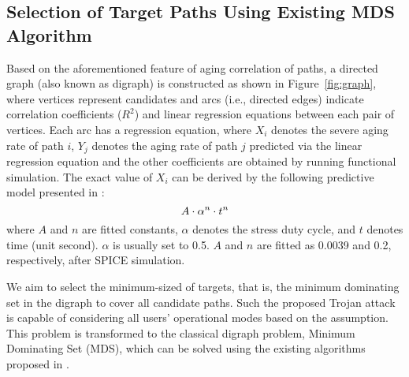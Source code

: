 \subsection{Selection of Target Paths Using Existing MDS Algorithm}
\label{sec:frame:mds}
Based on the aforementioned feature of aging correlation of paths, a directed graph (also known as digraph) is constructed as shown in Figure~\ref{fig:graph}, where vertices represent candidates and arcs (i.e., directed edges) indicate correlation coefficients ($R^2$) and linear regression equations between each pair of vertices. Each arc has a regression equation, where $X_{i}$ denotes the severe aging rate of path $i$, $Y_{j}$ denotes the aging rate of path $j$ predicted via the linear regression equation and the other coefficients are obtained by running functional simulation. The exact value of $X_{i}$ can be derived by the following predictive model presented in \cite{wang2007efficient}:
\begin{equation}
	\fontsize{8}{8} \selectfont
	A \cdot \alpha^n \cdot t^n 
	\label{eq:worst}
\end{equation}
where $A$ and $n$ are fitted constants, $\alpha$ denotes the stress duty cycle, and $t$ denotes time (unit second). $\alpha$ is usually set to 0.5. $A$ and $n$ are fitted as 0.0039 and 0.2, respectively, after SPICE simulation.

\begin{comment}
Consider the red equation in Figure~\ref{fig:graph}:
\begin{equation}
	\centering
	\fontsize{8}{8} \selectfont
	Y_{1} = 0.98 \cdot X_{2} - 0.02
\end{equation}
where $X_{2}$ is the aging rate of vertex/path 2 and $Y_{1}$ is the aging rate of vertex/path 1, which can be predicted as 0.98 multiplied by $X_{2}$ minus 0.02.
Moreover, after the graph is constructed, it can be further simplified by as many weak arcs as possible, among which the aging correlations between pairs of paths/vertices are below the specified threshold.
\end{comment}
We aim to select the minimum-sized of targets, that is, the minimum dominating set in the digraph to cover all candidate paths. Such the proposed Trojan attack is capable of considering all users' operational modes based on the assumption. This problem is transformed to the classical digraph problem, Minimum Dominating Set (MDS), which can be solved using the existing algorithms proposed in \cite{ore1962theory}. %
